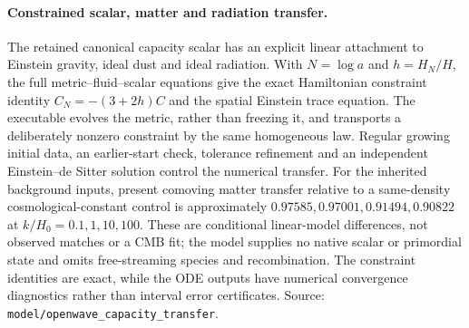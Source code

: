 \paragraph{Constrained scalar, matter and radiation transfer.}
The retained canonical capacity scalar has an explicit linear attachment
to Einstein gravity, ideal dust and ideal radiation. With $N=\log a$ and
$h=H_N/H$, the full metric--fluid--scalar equations give the exact Hamiltonian
constraint identity $C_N=-(3+2h)C$ and the spatial Einstein trace equation.
The executable evolves the metric, rather than freezing it, and transports a
deliberately nonzero constraint by the same homogeneous law. Regular growing
initial data, an earlier-start check, tolerance refinement and an independent
Einstein--de Sitter solution control the numerical transfer. For the inherited
background inputs, present comoving matter transfer relative to a
same-density cosmological-constant control is approximately
$0.97585,0.97001,0.91494,0.90822$ at $k/H_0=0.1,1,10,100$.
These are conditional linear-model differences, not observed matches or a
CMB fit; the model supplies no native scalar or primordial state and omits
free-streaming species and recombination. The constraint identities are exact, while the ODE
outputs have numerical convergence diagnostics rather than interval error
certificates. Source: \texttt{model/openwave\_capacity\_transfer}.
